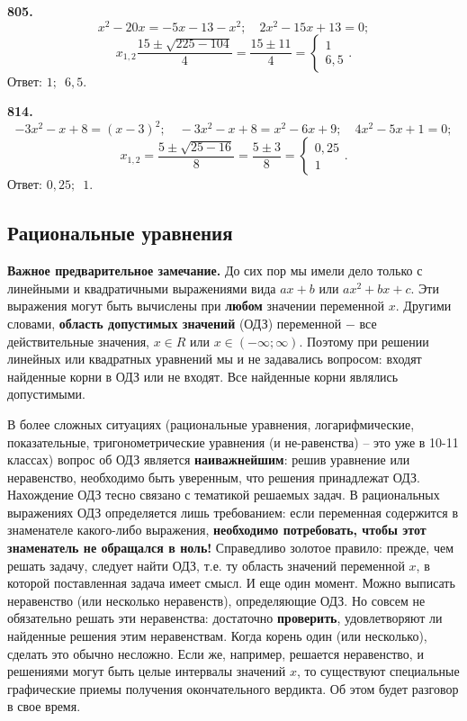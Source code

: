 \textbf{805.} $$x^2-20x=-5x-13-x^2;\quad 2x^2-15x+13=0;$$$$ x_{1,2}\frac{15\pm\sqrt{225-104}}{4}=\frac{15\pm11}{4}=\begin{cases}1 \\6,5 \end{cases}.$$ \newline \null \hspace*{\fill} Ответ: $1;\enspace6,5$. 

\textbf{814.} $$-3x^2-x+8=(x-3)^2;\quad -3x^2-x+8=x^2-6x+9;\quad 4x^2-5x+1=0;$$$$ x_{1,2}=\frac{5\pm\sqrt{25-16}}{8}=\frac{5\pm3}{8}=\begin{cases}0,25 \\1 \end{cases}.$$ \newline \null \hspace*{\fill} Ответ: $0,25;\enspace1$. 

\subsection{Рациональные уравнения}


\textbf{Важное предварительное замечание.} До сих пор мы имели дело только с линейными и квадратичными выражениями вида $ax+b$ или $ax^2+bx+c$. Эти выражения могут быть вычислены при \textbf{любом}  значении переменной $x$. Другими словами, \textbf{область допустимых значений} (ОДЗ)  переменной $-$ все действительные значения, $x\in R$ или $x\in (-\infty;\infty)$. Поэтому при решении линейных или квадратных уравнений мы и не задавались вопросом: входят найденные корни в ОДЗ или не входят. Все найденные корни являлись допустимыми.

В более сложных ситуациях (рациональные уравнения, логарифмические, показательные, тригонометрические уравнения (и не-\newline равенства) – это уже в 10-11 классах)  вопрос об ОДЗ  является \textbf{наиважнейшим}:  решив уравнение или неравенство, необходимо быть уверенным, что решения принадлежат ОДЗ. 
Нахождение ОДЗ тесно связано с тематикой решаемых задач. В рациональных выражениях ОДЗ определяется лишь требованием: если переменная содержится в знаменателе какого-либо выражения, \textbf{необходимо потребовать, чтобы этот знаменатель не обращался в ноль!} Справедливо золотое правило: прежде, чем решать задачу, следует найти ОДЗ, т.е. ту область значений переменной $x$, в которой поставленная задача имеет смысл.
И еще один момент. Можно выписать неравенство (или несколько неравенств), определяющие ОДЗ. Но совсем не обязательно решать эти неравенства: достаточно \textbf{проверить}, удовлетворяют ли найденные решения этим неравенствам. Когда корень один (или несколько), сделать это обычно несложно. Если же, например, решается неравенство, и решениями могут быть целые интервалы значений $x$, то существуют специальные графические приемы получения окончательного вердикта. Об этом будет разговор в свое время.

